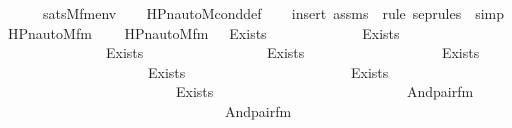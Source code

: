 \begin{isabellebody}
\ \ \ \ \ {\isasymlongleftrightarrow}\ sats{\isacharparenleft}{\kern0pt}M{\isacharcomma}{\kern0pt}{\isacharquery}{\kern0pt}fm{\isacharparenleft}{\kern0pt}{}{\isacharcomma}{\kern0pt}{}{\isacharcomma}{\kern0pt}{}{\isacharparenright}{\kern0pt}{\isacharcomma}{\kern0pt}env{\isacharparenright}{\kern0pt}{\isachardoublequoteclose}\isanewline
%
\isadelimproof
\ \ %
\endisadelimproof
%
\isatagproof
{}\isamarkupfalse%
\ HPn{\isacharunderscore}{\kern0pt}auto{\isacharunderscore}{\kern0pt}M{\isacharunderscore}{\kern0pt}cond{\isacharunderscore}{\kern0pt}def\isanewline
\ \ \isamarkupfalse%
\ {\isacharparenleft}{\kern0pt}insert\ assms\ {\isacharsemicolon}{\kern0pt}\ {\isacharparenleft}{\kern0pt}rule\ sep{\isacharunderscore}{\kern0pt}rules\ {\isacharbar}{\kern0pt}\ simp{\isacharparenright}{\kern0pt}{\isacharplus}{\kern0pt}{\isacharparenright}{\kern0pt}%
\endisatagproof
{\isafoldproof}%
%
\isadelimproof
\isanewline
%
\endisadelimproof
\isanewline
{}\isamarkupfalse%
\isanewline
\isanewline
{}\isamarkupfalse%
\ HPn{\isacharunderscore}{\kern0pt}auto{\isacharunderscore}{\kern0pt}M{\isacharunderscore}{\kern0pt}fm\ \ \isanewline
\ \ {\isachardoublequoteopen}HPn{\isacharunderscore}{\kern0pt}auto{\isacharunderscore}{\kern0pt}M{\isacharunderscore}{\kern0pt}fm\ {\isacharequal}{\kern0pt}\ \ Exists\isanewline
\ \ \ \ \ \ \ \ \ \ \ \ \ {\isacharparenleft}{\kern0pt}Exists\isanewline
\ \ \ \ \ \ \ \ \ \ \ \ \ \ \ {\isacharparenleft}{\kern0pt}Exists\isanewline
\ \ \ \ \ \ \ \ \ \ \ \ \ \ \ \ \ {\isacharparenleft}{\kern0pt}Exists\isanewline
\ \ \ \ \ \ \ \ \ \ \ \ \ \ \ \ \ \ \ {\isacharparenleft}{\kern0pt}Exists\isanewline
\ \ \ \ \ \ \ \ \ \ \ \ \ \ \ \ \ \ \ \ \ {\isacharparenleft}{\kern0pt}Exists\isanewline
\ \ \ \ \ \ \ \ \ \ \ \ \ \ \ \ \ \ \ \ \ \ \ {\isacharparenleft}{\kern0pt}Exists\isanewline
\ \ \ \ \ \ \ \ \ \ \ \ \ \ \ \ \ \ \ \ \ \ \ \ \ {\isacharparenleft}{\kern0pt}Exists\isanewline
\ \ \ \ \ \ \ \ \ \ \ \ \ \ \ \ \ \ \ \ \ \ \ \ \ \ \ {\isacharparenleft}{\kern0pt}And{\isacharparenleft}{\kern0pt}pair{\isacharunderscore}{\kern0pt}fm{\isacharparenleft}{\kern0pt}{}{\isacharcomma}{\kern0pt}\ {}{\isacharcomma}{\kern0pt}\ {}{\isacharparenright}{\kern0pt}{\isacharcomma}{\kern0pt}\isanewline
\ \ \ \ \ \ \ \ \ \ \ \ \ \ \ \ \ \ \ \ \ \ \ \ \ \ \ \ \ \ \ \ And{\isacharparenleft}{\kern0pt}pair{\isacharunderscore}{\kern0pt}fm{\isacharparenleft}{\kern0pt}{}{\isacharcomma}{\kern0pt}\ {}{\isacharcomma}{\kern0pt}\ {}{\isacharparenright}{\kern0pt}{\isacharcomma}{\kern0pt}\isanewline

\end{isabellebody}
